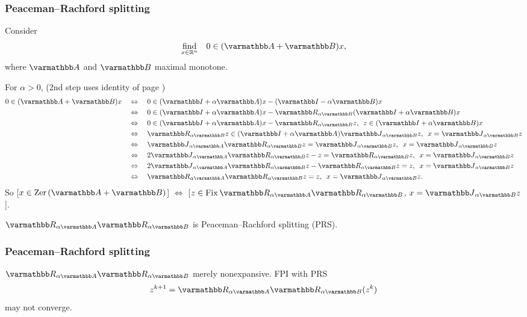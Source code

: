 \documentclass[10pt,mathserif]{beamer}
\begin{document}
\begin{frame}[plain]
\frametitle{Peaceman--Rachford splitting}
Consider
\[
\begin{array}{ll}
\underset{x\in \reals^n}{\mbox{find}}&0\in (\opA+\opB)x,
\end{array}
\]
where $\opA$ and $\opB$ maximal monotone.
\vspace{0.1in}

For $\alpha>0$, \hspace{5em} (2nd step uses identity of page \pageref{refl-identities})
\begin{align*}
0\in (\opA+\opB)x
\quad&\Leftrightarrow\quad
0\in (\opI+\alpha \opA)x-(\opI-\alpha \opB)x\\
&\Leftrightarrow\quad
0\in (\opI+\alpha \opA)x-\opR_{\alpha \opB}(\opI+\alpha \opB)x\\
&\Leftrightarrow\quad
0\in (\opI+\alpha \opA)x-\opR_{\alpha \opB}z,
\,~z\in (\opI+\alpha \opB)x\\
&\Leftrightarrow\quad
\opR_{\alpha \opB} z\in (\opI+\alpha \opA)\opJ_{\alpha \opB}z,
\,~x=\opJ_{\alpha \opB}z\\
&\Leftrightarrow\quad
\opJ_{\alpha \opA}\opR_{\alpha \opB} z= \opJ_{\alpha \opB}z,
\,~x=\opJ_{\alpha \opB}z\\
&\Leftrightarrow\quad
2\opJ_{\alpha \opA}\opR_{\alpha \opB} z-z= \opR_{\alpha \opB}z,
\,~x=\opJ_{\alpha \opB}z\\
&\Leftrightarrow\quad
2\opJ_{\alpha \opA}\opR_{\alpha \opB} z- \opR_{\alpha \opB}z=z,
\,~x=\opJ_{\alpha \opB}z\\
&\Leftrightarrow\quad
\opR_{\alpha \opA}\opR_{\alpha \opB} z=z,
\,~x=\opJ_{\alpha \opB}z.
\end{align*}
So [$x\in \zer(\opA+\opB)$] $\Leftrightarrow$ [$z\in\fix  \opR_{\alpha \opA}\opR_{\alpha \opB}$, $x=\opJ_{\alpha \opB}z$].
\vspace{0.1in}


$\opR_{\alpha \opA}\opR_{\alpha \opB}$ is Peaceman--Rachford splitting (PRS).

\end{frame}

\begin{frame}
\frametitle{Peaceman--Rachford splitting}

$\opR_{\alpha \opA}\opR_{\alpha \opB}$ merely nonexpansive. FPI with PRS
\[
z^{k+1} = \opR_{\alpha \opA}\opR_{\alpha \opB}(z^{k})
\]
may not converge.
\end{frame}
\end{document}
